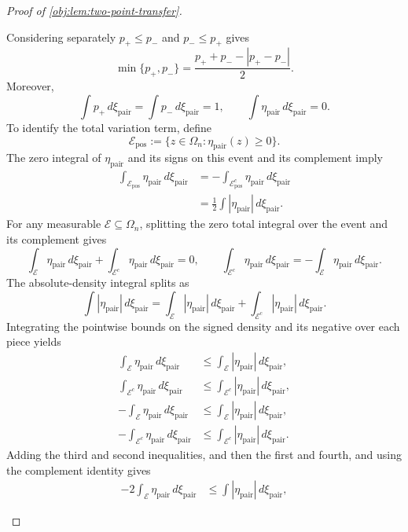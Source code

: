 \documentclass[11pt]{article}
\begin{document}
\begin{proof}[Proof of \cref{obj:lem:two-point-transfer}]
\begin{enumerate}
Considering separately \(p_+\le p_-\) and \(p_-\le p_+\) gives
\[
\min\{p_+,p_-\}
=
\frac{p_++p_--|p_+-p_-|}{2}.
\]
Moreover,
\[
\int p_+\,d\xi_{\mathrm{pair}}
=
\int p_-\,d\xi_{\mathrm{pair}}
=1,
\qquad
\int\eta_{\mathrm{pair}}\,d\xi_{\mathrm{pair}}=0.
\]
To identify the total variation term, define
\[
\mathcal E_{\mathrm{pos}}
:=
\{z\in\Omega_n:\eta_{\mathrm{pair}}(z)\ge0\}.
\]
The zero integral of \(\eta_{\mathrm{pair}}\) and its signs on this event and its complement imply
\[
\begin{aligned}
\int_{\mathcal E_{\mathrm{pos}}}\eta_{\mathrm{pair}}\,d\xi_{\mathrm{pair}}
&=
-\int_{\mathcal E_{\mathrm{pos}}^c}\eta_{\mathrm{pair}}\,d\xi_{\mathrm{pair}}
\\
&=
\frac12\int|\eta_{\mathrm{pair}}|\,d\xi_{\mathrm{pair}}.
\end{aligned}
\]
For any measurable \(\mathcal E\subseteq\Omega_n\), splitting the zero total integral over the event and its complement gives
\[
\int_{\mathcal E}\eta_{\mathrm{pair}}\,d\xi_{\mathrm{pair}}
+
\int_{\mathcal E^c}\eta_{\mathrm{pair}}\,d\xi_{\mathrm{pair}}
=0,
\qquad
\int_{\mathcal E^c}\eta_{\mathrm{pair}}\,d\xi_{\mathrm{pair}}
=
-\int_{\mathcal E}\eta_{\mathrm{pair}}\,d\xi_{\mathrm{pair}}.
\]
The absolute-density integral splits as
\[
\int|\eta_{\mathrm{pair}}|\,d\xi_{\mathrm{pair}}
=
\int_{\mathcal E}|\eta_{\mathrm{pair}}|\,d\xi_{\mathrm{pair}}
+
\int_{\mathcal E^c}|\eta_{\mathrm{pair}}|\,d\xi_{\mathrm{pair}}.
\]
Integrating the pointwise bounds on the signed density and its negative over each piece yields
\[
\begin{aligned}
\int_{\mathcal E}\eta_{\mathrm{pair}}\,d\xi_{\mathrm{pair}}
&\le\int_{\mathcal E}|\eta_{\mathrm{pair}}|\,d\xi_{\mathrm{pair}},
\\
\int_{\mathcal E^c}\eta_{\mathrm{pair}}\,d\xi_{\mathrm{pair}}
&\le\int_{\mathcal E^c}|\eta_{\mathrm{pair}}|\,d\xi_{\mathrm{pair}},
\\
-\int_{\mathcal E}\eta_{\mathrm{pair}}\,d\xi_{\mathrm{pair}}
&\le\int_{\mathcal E}|\eta_{\mathrm{pair}}|\,d\xi_{\mathrm{pair}},
\\
-\int_{\mathcal E^c}\eta_{\mathrm{pair}}\,d\xi_{\mathrm{pair}}
&\le\int_{\mathcal E^c}|\eta_{\mathrm{pair}}|\,d\xi_{\mathrm{pair}}.
\end{aligned}
\]
Adding the third and second inequalities, and then the first and fourth, and using the complement identity gives
\[
\begin{aligned}
-2\int_{\mathcal E}\eta_{\mathrm{pair}}\,d\xi_{\mathrm{pair}}
&\le\int|\eta_{\mathrm{pair}}|\,d\xi_{\mathrm{pair}},

\end{aligned}\]
\end{enumerate}
\end{proof}
\end{document}
